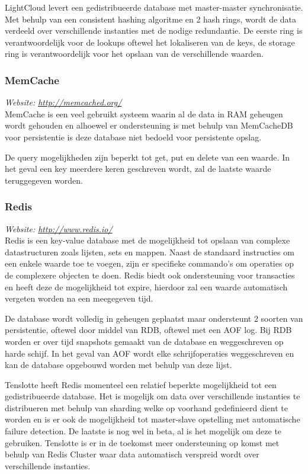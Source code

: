LightCloud levert een gedistribueerde database met master-master synchronisatie. Met behulp van een consistent hashing algoritme en 2 hash rings, wordt de data verdeeld over verschillende instanties met de nodige redundantie. De eerste ring is verantwoordelijk voor de lookups oftewel het lokaliseren van de keys, de storage ring is verantwoordelijk voor het opslaan van de verschillende waarden. 

\subsubsection{MemCache}
\textit{Website: \url{http://memcached.org/}}\\
MemCache is een veel gebruikt systeem waarin al de data in RAM geheugen wordt gehouden en alhoewel er ondersteuning is met behulp van MemCacheDB voor persistentie is deze database niet bedoeld voor persistente opslag. 

De query mogelijkheden zijn beperkt tot get, put en delete van een waarde. In het geval een key meerdere keren geschreven wordt, zal de laatste waarde teruggegeven worden. 

\subsubsection{Redis}
\textit{Website: \url{http://www.redis.io/}}\\
Redis is een key-value database met de mogelijkheid tot opslaan van complexe datastructuren zoals lijsten, sets en mappen. Naast de standaard instructies om een enkele waarde toe te voegen, zijn er specifieke commando's om operaties op de complexere objecten te doen. Redis biedt ook ondersteuning voor transacties en heeft deze de mogelijkheid tot expire, hierdoor zal een waarde automatisch vergeten worden na een meegegeven tijd. 

De database wordt volledig in geheugen geplaatst maar ondersteunt 2 soorten van persistentie, oftewel door middel van RDB, oftewel met een AOF log. Bij RDB worden er over tijd snapshots gemaakt van de database en weggeschreven op harde schijf. In het geval van AOF wordt elke schrijfoperaties weggeschreven en kan de database opgebouwd worden met behulp van deze lijst.

Tenslotte heeft Redis momenteel een relatief beperkte mogelijkheid tot een gedistribueerde database. Het is mogelijk om data over verschillende instanties te distribueren met behulp van sharding welke op voorhand gedefinieerd dient te worden en is er ook de mogelijkheid tot master-slave opstelling met automatische failure detection.
De laatste is nog wel in beta, al is het mogelijk om deze te gebruiken. Tenslotte is er in de toekomst meer ondersteuning op komst met behulp van Redis Cluster waar data automatisch verspreid wordt over verschillende instanties. 

